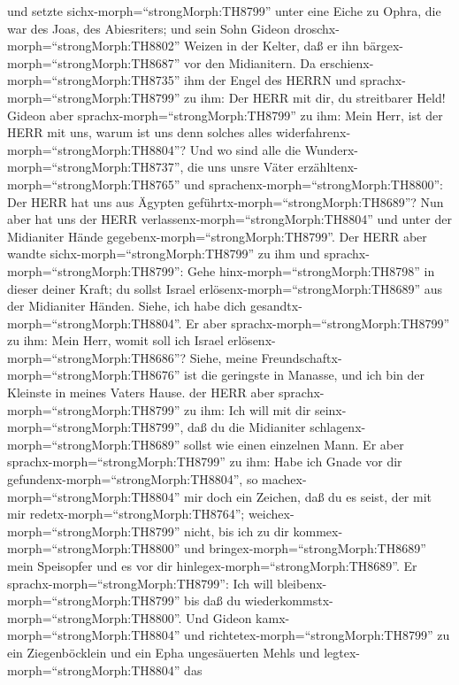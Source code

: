 und setzte sichx-morph=``strongMorph:TH8799'' unter eine Eiche zu Ophra,
die war des Joas, des Abiesriters; und sein Sohn Gideon
droschx-morph=``strongMorph:TH8802'' Weizen in der Kelter, daß er ihn
bärgex-morph=``strongMorph:TH8687'' vor den Midianitern. 
Da erschienx-morph=``strongMorph:TH8735'' ihm der Engel des HERRN und
sprachx-morph=``strongMorph:TH8799'' zu ihm: Der HERR mit dir, du
streitbarer Held!  Gideon aber
sprachx-morph=``strongMorph:TH8799'' zu ihm: Mein Herr, ist der HERR mit
uns, warum ist uns denn solches alles
widerfahrenx-morph=``strongMorph:TH8804''? Und wo sind alle die
Wunderx-morph=``strongMorph:TH8737'', die uns unsre Väter
erzähltenx-morph=``strongMorph:TH8765'' und
sprachenx-morph=``strongMorph:TH8800'': Der HERR hat uns aus Ägypten
geführtx-morph=``strongMorph:TH8689''? Nun aber hat uns der HERR
verlassenx-morph=``strongMorph:TH8804'' und unter der Midianiter Hände
gegebenx-morph=``strongMorph:TH8799''.  Der HERR aber
wandte sichx-morph=``strongMorph:TH8799'' zu ihm und
sprachx-morph=``strongMorph:TH8799'': Gehe
hinx-morph=``strongMorph:TH8798'' in dieser deiner Kraft; du sollst
Israel erlösenx-morph=``strongMorph:TH8689'' aus der Midianiter Händen.
Siehe, ich habe dich gesandtx-morph=``strongMorph:TH8804''.
 Er aber sprachx-morph=``strongMorph:TH8799'' zu ihm: Mein
Herr, womit soll ich Israel erlösenx-morph=``strongMorph:TH8686''?
Siehe, meine Freundschaftx-morph=``strongMorph:TH8676'' ist die
geringste in Manasse, und ich bin der Kleinste in meines Vaters Hause.
 der HERR aber sprachx-morph=``strongMorph:TH8799'' zu ihm:
Ich will mit dir seinx-morph=``strongMorph:TH8799'', daß du die
Midianiter schlagenx-morph=``strongMorph:TH8689'' sollst wie einen
einzelnen Mann.  Er aber
sprachx-morph=``strongMorph:TH8799'' zu ihm: Habe ich Gnade vor dir
gefundenx-morph=``strongMorph:TH8804'', so
machex-morph=``strongMorph:TH8804'' mir doch ein Zeichen, daß du es
seist, der mit mir redetx-morph=``strongMorph:TH8764''; 
weichex-morph=``strongMorph:TH8799'' nicht, bis ich zu dir
kommex-morph=``strongMorph:TH8800'' und
bringex-morph=``strongMorph:TH8689'' mein Speisopfer und es vor dir
hinlegex-morph=``strongMorph:TH8689''. Er
sprachx-morph=``strongMorph:TH8799'': Ich will
bleibenx-morph=``strongMorph:TH8799'' bis daß du
wiederkommstx-morph=``strongMorph:TH8800''.  Und Gideon
kamx-morph=``strongMorph:TH8804'' und
richtetex-morph=``strongMorph:TH8799'' zu ein Ziegenböcklein und ein
Epha ungesäuerten Mehls und legtex-morph=``strongMorph:TH8804'' das
